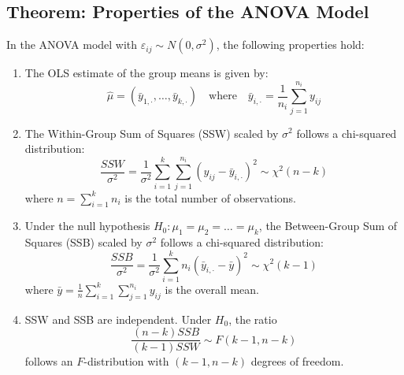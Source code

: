 \documentclass[open=any, 11pt,paper=A4]{scrreprt}
\begin{document}
\subsection{Theorem: Properties of the ANOVA Model}

\begin{theorem}
In the ANOVA model with $\varepsilon_{ij} \sim N(0, \sigma^2)$, the following properties hold:
\begin{enumerate}
    \item The OLS estimate of the group means is given by:
    \[
    \hat{\mu} = \left(\bar{y}_{1,\cdot}, \dots, \bar{y}_{k,\cdot}\right) \quad \text{where} \quad \bar{y}_{i,\cdot} = \frac{1}{n_i} \sum_{j=1}^{n_i} y_{ij}
    \]
    
    \item The Within-Group Sum of Squares (SSW) scaled by $\sigma^2$ follows a chi-squared distribution:
    \[
    \frac{SSW}{\sigma^2} = \frac{1}{\sigma^2} \sum_{i=1}^k \sum_{j=1}^{n_i} \left(y_{ij} - \bar{y}_{i,\cdot}\right)^2 \sim \chi^2(n - k)
    \]
    where $n = \sum_{i=1}^k n_i$ is the total number of observations.
    
    \item Under the null hypothesis $H_0: \mu_1 = \mu_2 = \dots = \mu_k$, the Between-Group Sum of Squares (SSB) scaled by $\sigma^2$ follows a chi-squared distribution:
    \[
    \frac{SSB}{\sigma^2} = \frac{1}{\sigma^2} \sum_{i=1}^k n_i \left(\bar{y}_{i,\cdot} - \bar{y}\right)^2 \sim \chi^2(k - 1)
    \]
    where $\bar{y} = \frac{1}{n} \sum_{i=1}^k \sum_{j=1}^{n_i} y_{ij}$ is the overall mean.
    
    \item SSW and SSB are independent. Under $H_0$, the ratio
    \[
    \frac{(n - k)SSB}{(k - 1)SSW} \sim F(k - 1, n - k)
    \]
    follows an $F$-distribution with $(k - 1, n - k)$ degrees of freedom.
\end{enumerate}
\end{theorem}
\end{document}
